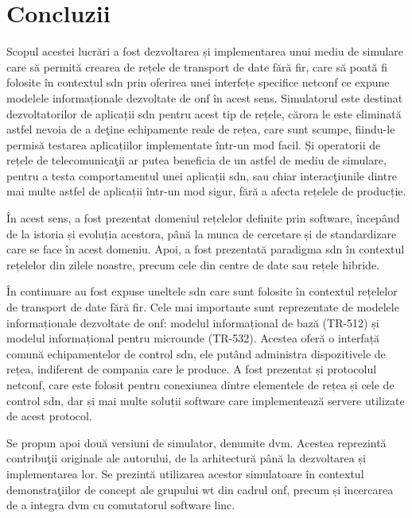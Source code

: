\chapter{Concluzii\label{ch:concluzii}}

Scopul acestei lucrări a fost dezvoltarea și implementarea unui mediu de simulare care să permită crearea de rețele de transport de date fără fir, care să poată fi folosite în contextul \gls{sdn} prin oferirea unei interfețe specifice \gls{netconf} ce expune modelele informaționale dezvoltate de \gls{onf} în acest sens. Simulatorul este destinat dezvoltatorilor de aplicații \gls{sdn} pentru acest tip de rețele, cărora le este eliminată astfel nevoia de a deţine echipamente reale de rețea, care sunt scumpe, fiindu-le permisă testarea aplicațiilor implementate într-un mod facil. Și operatorii de rețele de telecomunicaţii ar putea beneficia de un astfel de mediu de simulare, pentru a testa comportamentul unei aplicații \gls{sdn}, sau chiar interacţiunile dintre mai multe astfel de aplicații într-un mod sigur, fără a afecta rețelele de producție.

În acest sens, a fost prezentat domeniul rețelelor definite prin software, începând de la istoria și evoluția acestora, până la munca de cercetare și de standardizare care se face în acest domeniu. Apoi, a fost prezentată paradigma \gls{sdn} în contextul rețelelor din zilele noastre, precum cele din centre de date sau rețele hibride.

În continuare au fost expuse uneltele \gls{sdn} care sunt folosite în contextul rețelelor de transport de date fără fir. Cele mai importante sunt reprezentate de modelele informaționale dezvoltate de \gls{onf}: modelul informațional de bază (TR-512) și modelul informațional pentru microunde (TR-532). Acestea oferă o interfață comună echipamentelor de control \gls{sdn}, ele putând administra dispozitivele de rețea, indiferent de compania care le produce. A fost prezentat și protocolul \gls{netconf}, care este folosit pentru conexiunea dintre elementele de rețea și cele de control \gls{sdn}, dar și mai multe soluții software care implementează servere utilizate de acest protocol.

Se propun apoi două versiuni de simulator, denumite \gls{dvm}. Acestea reprezintă contribuţii originale ale autorului, de la arhitectură până la dezvoltarea și implementarea lor. Se prezintă utilizarea acestor simulatoare în contextul demonstraţiilor de concept ale grupului \gls{wt} din cadrul \gls{onf}, precum și încercarea de a integra \gls{dvm} cu comutatorul software \gls{linc}.

